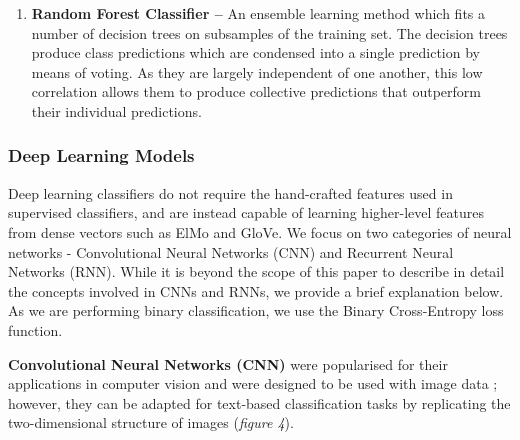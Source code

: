 \documentclass[12pt,a4paper]{article}
\begin{document}
\begin{enumerate}
	\item \textbf{Random Forest Classifier --}
	An ensemble learning method which fits a number of decision trees on subsamples of the training set. The decision trees produce class predictions which are condensed into a single prediction by means of voting. As they are largely independent of one another, this low correlation allows them to produce collective predictions that outperform their individual predictions.
\end{enumerate}


\subsubsection{Deep Learning Models}
Deep learning classifiers do not require the  hand-crafted features used in supervised classifiers, and are instead capable of learning higher-level features from dense vectors such as ElMo and GloVe. We focus on two categories of neural networks - Convolutional Neural Networks (CNN) and Recurrent Neural Networks (RNN). While it is beyond the scope of this paper to describe in detail the concepts involved in CNNs and RNNs, we provide a brief explanation below. As we are performing binary classification, we use the Binary Cross-Entropy loss function.\\\vspace{-5pt}

\noindent \textbf{Convolutional Neural Networks (CNN)}\cite{lecun1998gradient} were popularised for their applications in computer vision and were designed to be used with image data \cite{krizhevsky2012imagenet}; however, they can be adapted for text-based classification tasks by replicating the two-dimensional structure of images (\textit{figure 4}).\vspace{-5pt}
\end{document}
